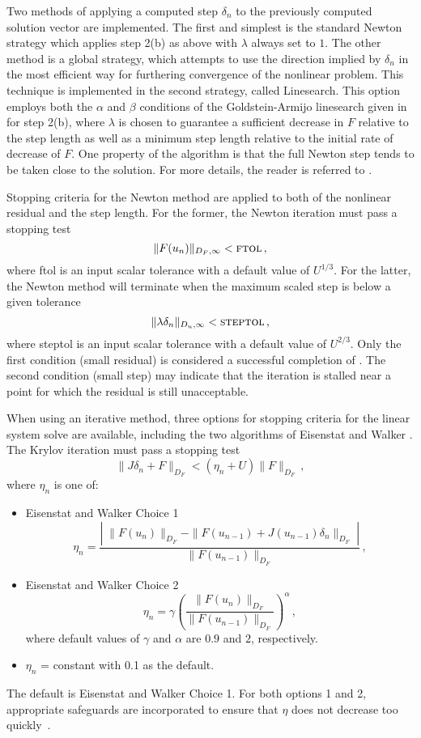 Two methods of applying a computed step $\delta_n$ to the
previously computed solution vector are implemented. The first and
simplest is the standard Newton strategy which applies step 2(b) as
above with $\lambda$ always set to $1$. The other method is a
global strategy, which attempts to use the direction implied by
$\delta_n$ in the most efficient way for furthering convergence of
the nonlinear problem. This technique is implemented in the second
strategy, called Linesearch.  This option employs both the
$\alpha$ and $\beta$ conditions of the Goldstein-Armijo linesearch
given in \cite{DeSc:96} for step 2(b), where $\lambda$ is chosen
to guarantee a sufficient decrease in $F$ relative to the step
length as well as a minimum step length relative to the initial
rate of decrease of $F$.  One property of the algorithm is that
the full Newton step tends to be taken close to the solution.  For
more details, the reader is referred to \cite{DeSc:96}.

Stopping criteria for the Newton method are applied to
both of the nonlinear residual and the step length.  For the
former, the Newton iteration must pass a stopping test
\[ \|F(u_n)\|_{D_F,\infty} < \mbox{\sc ftol} \, , \]
where {\sc ftol} is an input scalar tolerance with a default value
of $U^{1/3}$. For the latter, the Newton method will terminate
when the maximum scaled step is below a given tolerance
\[ \|\lambda\delta_n\|_{D_u,\infty} < \mbox{\sc steptol} \, , \]
where {\sc steptol} is an input scalar tolerance with a default
value of $U^{2/3}$.  Only the first condition (small residual)
is considered a successful completion of {\kinsol}.  The second
condition (small step) may indicate that the iteration is stalled
near a point for which the residual is still unacceptable.

When using an iterative method, three options for stopping criteria
for the linear system solve are available, including the two algorithms
of Eisenstat and Walker \cite{EiWa:96}. The Krylov iteration must pass
a stopping test
\[ \|J \delta_n + F\|_{D_F} < (\eta_n + U) \|F\|_{D_F} \, , \]
where $\eta_n$ is one of:
\begin{itemize}
\item Eisenstat and Walker Choice 1
  \[
  \eta_n = \frac{\left|\; \|F(u_n)\|_{D_F}
      - \|F(u_{n-1}) + J(u_{n-1}) \delta_n \|_{D_F}
      \; \right|}
  {\|F(u_{n-1})\|_{D_F}} \, ,
  \]
\item Eisenstat and Walker Choice 2
  \[
  \eta_n = \gamma
  \left( \frac{ \|F(u_n)\|_{D_F}}{\|F(u_{n-1})\|_{D_F}} \right)^{\alpha} \, ,
  \]
where default values of $\gamma$ and $\alpha$ are $0.9$ and $2$,
 respectively.
\item  $\eta_n$ = constant with 0.1 as the default.
\end{itemize}
The default is Eisenstat and Walker Choice 1. For both options 1
and 2, appropriate safeguards are incorporated to ensure that
$\eta$ does not decrease too quickly~\cite{EiWa:96}.

